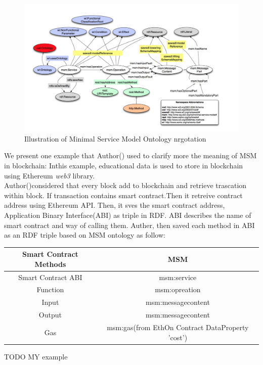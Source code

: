  \begin{center}
	\begin{figure}[htb!]
		
		\begin{minipage}{0.55\linewidth}
			\centering
			\includegraphics[width=1.95\textwidth]{images/chap02_MSM.png}
		\end{minipage}
		\caption[Illustration of Minimal Service ModelOntology]{Illustration of Minimal Service Model Ontology nrgotation}
		
	\end{figure}
	
\end{center}
We present one example that Author() used to clarify more the meaning of MSM in blockchain: Inthis example, educational data is used to store in blockchain using Ethereum \textit{web3} library.\\
Author()considered that every block add to blockchain and retrieve trascation within block. If transaction contains smart contract.Then it retreive contract address using Ethereum API. Then, it sves the smart contract address, Application Binary Interface(ABI) as triple in RDF. ABI describes the name of smart contract and way of calling them. Auther, then saved each method in ABI as an RDF triple based on MSM ontology as follow:

\begin{center}

\begin{tabular} { c | c }
	 
   \textbf{Smart Contract Methods} & \textbf{MSM}\\
	\hline
	Smart Contract ABI & msm:service\\
	\hline
	Function   & msm:opreation\\
    \hline
	 Input   & msm:messagecontent\\ 
	 \hline
	 Output   & msm:messagecontent\\ 
	 \hline
	 Gas   & msm:gas(from EthOn Contract DataProperty 'cost')
	
\end{tabular}

\end{center}
   TODO MY example  		
	
